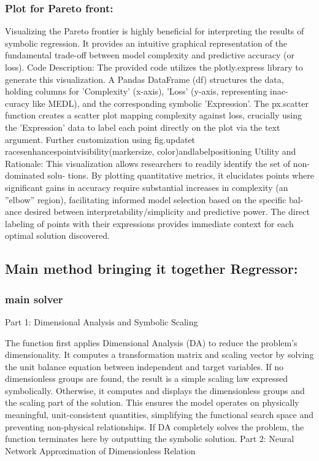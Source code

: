\documentclass{article}
\begin{document}
\subsubsection{Plot for Pareto front:}

Visualizing the Pareto frontier is highly beneficial for interpreting the results of symbolic regression. It provides
an intuitive graphical representation of the fundamental trade-off between model complexity and predictive
accuracy (or loss).
Code Description: The provided code utilizes the plotly.express library to generate this visualization. A Pandas
DataFrame (df) structures the data, holding columns for ’Complexity’ (x-axis), ’Loss’ (y-axis, representing inac-
curacy like MEDL), and the corresponding symbolic ’Expression’. The px.scatter function creates a scatter plot
mapping complexity against loss, crucially using the ’Expression’ data to label each point directly on the plot via
the text argument. Further customization using fig.updatet racesenhancespointvisibility(markersize, color)andlabelpositioning
Utility and Rationale: This visualization allows researchers to readily identify the set of non-dominated solu-
tions. By plotting quantitative metrics, it elucidates points where significant gains in accuracy require substantial
increases in complexity (an ”elbow” region), facilitating informed model selection based on the specific bal-
ance desired between interpretability/simplicity and predictive power. The direct labeling of points with their
expressions provides immediate context for each optimal solution discovered.\\ 

\subsection{Main method bringing it together Regressor: }

\subsubsection{main solver}

Part 1: Dimensional Analysis and Symbolic Scaling

The function first applies Dimensional Analysis (DA) to reduce the problem’s dimensionality. It computes a transformation matrix and scaling vector by solving the unit balance equation between independent and target variables. If no dimensionless groups are found, the result is a simple scaling law expressed symbolically. Otherwise, it computes and displays the dimensionless groups and the scaling part of the solution. This ensures the model operates on physically meaningful, unit-consistent quantities, simplifying the functional search space and preventing non-physical relationships. If DA completely solves the problem, the function terminates here by outputting the symbolic solution.
Part 2: Neural Network Approximation of Dimensionless Relation
\end{document}

